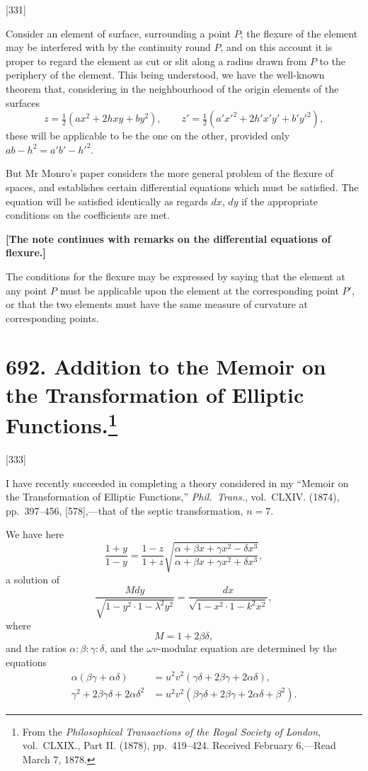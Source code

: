 \documentclass[12pt,a4paper]{article}
\theoremstyle{definition}
\begin{document}
[331]

Consider an element of surface, surrounding a point $P$; the flexure of the element may be interfered with by the continuity round $P$, and on this account it is proper to regard the element as cut or slit along a radius drawn from $P$ to the periphery of the element. This being understood, we have the well-known theorem that, considering in the neighbourhood of the origin elements of the surfaces
\[
z = \tfrac{1}{2}(ax^2 + 2hxy + by^2),\qquad
z' = \tfrac{1}{2}(a'x'^2 + 2h'x'y' + b'y'^2),
\]
these will be applicable to be the one on the other, provided only $ab - h^2 = a'b' - h'^2$.

But Mr Monro's paper considers the more general problem of the flexure of spaces, and establishes certain differential equations which must be satisfied. The equation will be satisfied identically as regards $dx$, $dy$ if the appropriate conditions on the coefficients are met.

\medskip
\noindent\textbf{[The note continues with remarks on the differential equations of flexure.]}

The conditions for the flexure may be expressed by saying that the element at any point $P$ must be applicable upon the element at the corresponding point $P'$, or that the two elements must have the same measure of curvature at corresponding points.

\newpage
\section[Addition to the Memoir on the Transformation of Elliptic Functions]{692. Addition to the Memoir on the Transformation of Elliptic Functions.\footnote{From the \textit{Philosophical Transactions of the Royal Society of London}, vol.\ CLXIX., Part II. (1878), pp.\ 419--424. Received February 6,---Read March 7, 1878.}}

[333]

I have recently succeeded in completing a theory considered in my ``Memoir on the Transformation of Elliptic Functions,'' \textit{Phil.\ Trans.}, vol.\ CLXIV. (1874), pp.\ 397--456, [578],---that of the septic transformation, $n = 7$.

We have here
\[
\frac{1 + y}{1 - y} = \frac{1 - z}{1 + z}\sqrt{\frac{\alpha + \beta x + \gamma x^2 - \delta x^3}{\alpha + \beta x + \gamma x^2 + \delta x^3}},
\]
a solution of
\[
\frac{Mdy}{\sqrt{1 - y^2\cdot 1 - \lambda^2y^2}} = \frac{dx}{\sqrt{1 - x^2\cdot 1 - k^2x^2}},
\]
where
\[
M = 1 + 2\beta\delta,
\]
and the ratios $\alpha : \beta : \gamma : \delta$, and the $\omega v$-modular equation are determined by the equations
\begin{align*}
\alpha(\beta\gamma + \alpha\delta) &= u^2v^2(\gamma\delta + 2\beta\gamma + 2\alpha\delta),\\
\gamma^2 + 2\beta\gamma\delta + 2\alpha\delta^2 &= u^2v^2(\beta\gamma\delta + 2\beta\gamma + 2\alpha\delta + \beta^2).
\end{align*}
\end{document}
